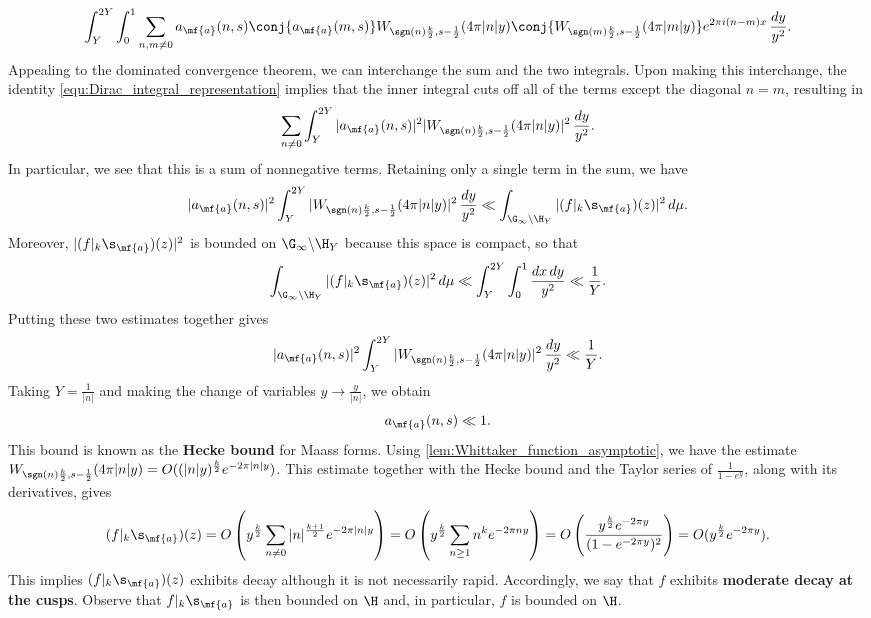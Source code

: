    \[
      \int_{Y}^{2Y}\int_{0}^{1}\sum_{n,m \neq 0}a_{\mf{a}}(n,s)\conj{a_{\mf{a}}(m,s)}W_{\sgn(n)\frac{k}{2},s-\frac{1}{2}}(4\pi|n|y)\conj{W_{\sgn(m)\frac{k}{2},s-\frac{1}{2}}(4\pi|m|y)}e^{2\pi i(n-m)x}\,\frac{dy}{y^{2}}.
    \]
    Appealing to the dominated convergence theorem, we can interchange the sum and the two integrals. Upon making this interchange, the identity \cref{equ:Dirac_integral_representation} implies that the inner integral cuts off all of the terms except the diagonal $n = m$, resulting in
    \[
      \sum_{n \neq 0}\int_{Y}^{2Y}|a_{\mf{a}}(n,s)|^{2}|W_{\sgn(n)\frac{k}{2},s-\frac{1}{2}}(4\pi|n|y)|^{2}\,\frac{dy}{y^{2}}.
    \]
    In particular, we see that this is a sum of nonnegative terms. Retaining only a single term in the sum, we have
    \[
      |a_{\mf{a}}(n,s)|^{2}\int_{Y}^{2Y}|W_{\sgn(n)\frac{k}{2},s-\frac{1}{2}}(4\pi|n|y)|^{2}\,\frac{dy}{y^{2}} \ll \int_{\G_{\infty}\backslash\H_{Y}}|(f|_{k}\s_{\mf{a}})(z)|^{2}\,d\mu.
    \]
    Moreover, $|(f|_{k}\s_{\mf{a}})(z)|^{2}$ is bounded on $\G_{\infty}\backslash\H_{Y}$ because this space is compact, so that
    \[
      \int_{\G_{\infty}\backslash\H_{Y}}|(f|_{k}\s_{\mf{a}})(z)|^{2}\,d\mu \ll \int_{Y}^{2Y}\int_{0}^{1}\frac{dx\,dy}{y^{2}} \ll \frac{1}{Y}.
    \]
    Putting these two estimates together gives
    \[
      |a_{\mf{a}}(n,s)|^{2}\int_{Y}^{2Y}|W_{\sgn(n)\frac{k}{2},s-\frac{1}{2}}(4\pi|n|y)|^{2}\,\frac{dy}{y^{2}} \ll \frac{1}{Y}.
    \]
    Taking $Y = \frac{1}{|n|}$ and making the change of variables $y \to \frac{y}{|n|}$, we obtain
    \[
      a_{\mf{a}}(n,s) \ll 1.
    \]
    This bound is known as the \textbf{Hecke bound} for Maass forms. Using \cref{lem:Whittaker_function_asymptotic}, we have the estimate $W_{\sgn(n)\frac{k}{2},s-\frac{1}{2}}(4\pi|n|y) = O((|n|y)^{\frac{k}{2}}e^{-2\pi|n|y})$. This estimate together with the Hecke bound and the Taylor series of $\frac{1}{1-e^{y}}$, along with its derivatives, gives
    \[
      (f|_{k}\s_{\mf{a}})(z) = O\left(y^{\frac{k}{2}}\sum_{n \neq 0}|n|^{\frac{k+1}{2}}e^{-2\pi|n|y}\right) = O\left(y^{\frac{k}{2}}\sum_{n \ge 1}n^{k}e^{-2\pi ny}\right) = O\left(\frac{y^{\frac{k}{2}}e^{-2\pi y}}{(1-e^{-2\pi y})^{2}}\right) = O(y^{\frac{k}{2}}e^{-2\pi y}).
    \]
    This implies $(f|_{k}\s_{\mf{a}})(z)$ exhibits decay although it is not necessarily rapid. Accordingly, we say that $f$ exhibits \textbf{moderate decay at the cusps}. Observe that $f|_{k}\s_{\mf{a}}$ is then bounded on $\H$ and, in particular, $f$ is bounded on $\H$.

